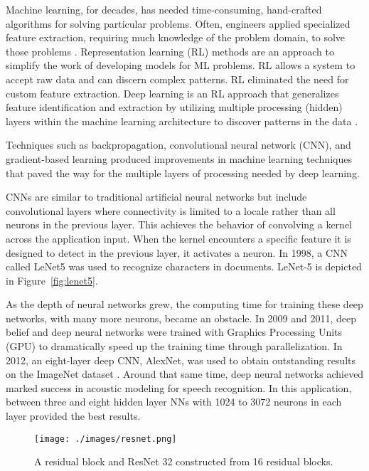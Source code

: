 Machine learning, for decades, has needed time-consuming, hand-crafted
algorithms for solving particular problems. Often, engineers applied specialized
feature extraction, requiring much knowledge of the problem domain, to solve
those problems \cite{lecun1995pattern, 726791}. Representation learning (RL)
methods are an approach to simplify the work of developing models for ML
problems. RL allows a system to accept raw data and can discern complex
patterns. RL eliminated the need for custom feature extraction. Deep learning is
an RL approach that generalizes feature identification and extraction by
utilizing multiple processing (hidden) layers within the machine learning
architecture to discover patterns in the data \cite{lecun2015deep}.


Techniques such as backpropagation\cite{6795724}, convolutional neural network
(CNN)\cite{fukushima1982neocognitron}, and gradient-based learning\cite{726791}
produced improvements in machine learning techniques that paved the way for the
multiple layers of processing needed by deep learning.

CNNs are similar to traditional artificial neural networks but include
convolutional layers where connectivity is limited to a locale rather than all
neurons in the previous layer.  This achieves the behavior of convolving a
kernel across the application input.  When the kernel encounters a specific feature
it is designed to detect in the previous layer, it activates a neuron\cite{li2021survey}.
In 1998, a CNN called LeNet5 was used to recognize characters in documents.  LeNet-5
is depicted in Figure~\ref{fig:lenet5}\cite{726791, zhang2023dive, lecun1995learning}.

As the depth of neural networks grew, the computing time for training these deep
networks, with many more neurons, became an obstacle. In 2009 and 2011, deep
belief and deep neural networks were trained with Graphics Processing Units
(GPU) to dramatically speed up the training time through
parallelization\cite{raina2009large, cirecsan2010deep}. In 2012, an eight-layer
deep CNN, AlexNet, was used to obtain outstanding results on the ImageNet
dataset \cite{krizhevsky2012imagenet}. Around that same time, deep neural
networks achieved marked success in acoustic modeling for speech recognition. In
this application, between three and eight hidden layer NNs with 1024 to 3072
neurons in each layer provided the best results\cite{hinton2012deep}.

\begin{figure}[h]
    \texttt{[image: ./images/resnet.png]}
    \caption{A residual block and ResNet 32 constructed from 16 residual blocks\cite{7780459}.}
    \label{fig:resnet}
\end{figure}

